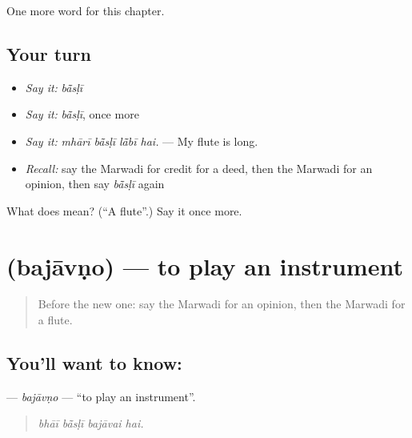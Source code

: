\begin{grammarlens}[title={What you've built}]
One more word for this chapter.
\end{grammarlens}

\subsection*{Your turn}
\begin{itemize}
\raggedright
  \item \emph{Say it:} \emph{bā̃sḷī}
  \item \emph{Say it:} \emph{bā̃sḷī}, once more
  \item \emph{Say it:} \emph{mhārī bā̃sḷī lā̃bī hai.} — My flute is long.
  \item \emph{Recall:} say the Marwadi for credit for a deed, then the Marwadi for an opinion, then say \emph{bā̃sḷī} again
\end{itemize}

\begin{tcolorbox}[breakable,colback=teal!4,colframe=teal!35!black,title={Before you move on}]
What does  mean? (\textquotedblleft{}A flute\textquotedblright{}.) Say it once more.
\end{tcolorbox}
\section[\texorpdfstring{\mw{बजावणो} (bajāvṇo)}{बजावणो (bajāvṇo)}]{ (bajāvṇo) — to play an instrument}

\label{lesson:MW-C276-bajavno}



\begin{quote}
Before the new one: say the Marwadi for an opinion, then the Marwadi for a flute.
\end{quote}

\subsection*{You'll want to know: }
\textbf{} — \emph{bajāvṇo} — \textquotedblleft{}to play an instrument\textquotedblright{}.

\begin{quote}
   
\end{quote}

\begin{quote}
\emph{bhāī bā̃sḷī bajāvai hai.}
\end{quote}


